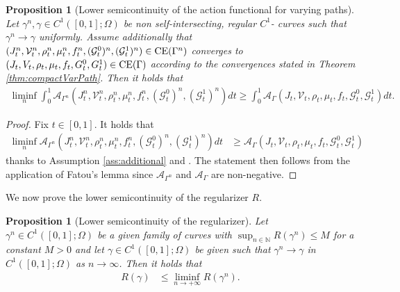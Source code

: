 \documentclass{article}
\def\calA{{\mathcal A}} \def\calB{{\mathcal B}} \def\calC{{\mathcal C}}
\newtheorem{proposition}[theorem]{Proposition}
\begin{document}
   \begin{proposition}[Lower semicontinuity of the action functional for varying paths]\label{prop:LowSemiContvar}
    Let $\gamma^n,\gamma\in C^{1}([0,1];\Omega)$ be non self-intersecting, regular $C^1$- curves such that $\gamma^n \rightarrow \gamma$ uniformly. Assume additionally that $(J_t^n,\mathcal{V}_t^n,\rho_t^n,\mu_t^n,f_t^n,(\mathcal{G}_t^0)^n,(\mathcal{G}_t^1)^n) \in {\rm CE}(\Gamma^n)$ converges to $(J_t,V_t,\rho_t,\mu_t,f_t,G_t^0,G_t^1) \in {\rm CE}(\Gamma)$ according to the convergences stated in Theorem \ref{thm:compactVarPath}. Then it holds that 
    \begin{align}
        \liminf_n \int_0^1 \calA_{\Gamma^n}(J_t^n,\mathcal{V}_t^n,\rho_t^n,\mu_t^n,f_t^n,(\mathcal{G}^0_t)^n,(\mathcal{G}_t^1)^n)dt \geq \int_0^1 \calA_{\Gamma}( J_t,\mathcal{V}_t,\rho_t,\mu_t,f_t,\mathcal{G}^0_t,\mathcal{G}_t^1)dt.
    \end{align}
\end{proposition}
\begin{proof}
Fix $t \in [0,1]$. It holds that 
\begin{align}
    \liminf_n \calA_{\Gamma^n}(J_t^n,\mathcal{V}_t^n,\rho_t^n,\mu_t^n,f_t^n,(\mathcal{G}^0_t)^n,(\mathcal{G}_t^1)^n)dt & \geq \calA_{\Gamma}( J_t,\mathcal{V}_t,\rho_t,\mu_t,f_t,\mathcal{G}^0_t,\mathcal{G}_t^1)\nonumber 
\end{align}
thanks to Assumption \ref{ass:additional} and \cite[Section 2, Theorem 1]{Lisini2010}. The statement then follows from the application of Fatou's lemma since $\mathcal{A}_{\Gamma^n}$ and $\mathcal{A}_{\Gamma}$ are non-negative. 
\end{proof}

We now prove the lower semicontinuity of the regularizer $R$. 

\begin{proposition}[Lower semicontinuity of the regularizer]\label{LowSemiCont}
    Let $\gamma^n\in C^{1}([0,1];\Omega)$ be a given family of curves with $\sup_{n\in \mathbb{N}}R(\gamma^n)\leq M$ for a constant $M>0$ and let $\gamma\in C^{1}([0,1];\Omega)$ be given such that $\gamma^n\to\gamma$ in $C^{1}([0,1];\Omega)$ as $n\to\infty$. Then it holds that
    \begin{align*}
        R(\gamma) &\leq \liminf\limits_{n\to+\infty} R(\gamma^n).
    \end{align*}
\end{proposition}
\end{document}

